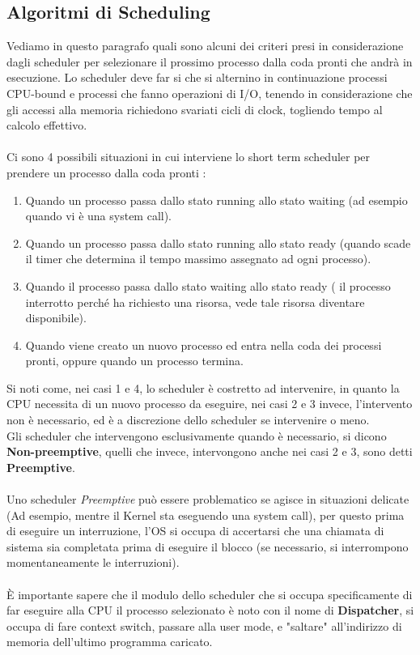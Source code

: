 \documentclass[12pt, letterpaper]{article}
\begin{document}
\subsection{Algoritmi di Scheduling}
Vediamo in questo paragrafo quali sono alcuni dei criteri presi in considerazione dagli scheduler per selezionare 
il prossimo processo dalla coda pronti che andrà in esecuzione. Lo scheduler deve far si che si alternino in continuazione 
processi CPU-bound e processi che fanno operazioni di I/O, tenendo in considerazione che gli accessi alla memoria 
richiedono svariati cicli di clock, togliendo tempo al calcolo effettivo.\\
\hphantom{text}\\Ci sono 4 possibili situazioni in cui interviene lo short term scheduler per prendere un processo 
dalla coda pronti :\begin{enumerate}
    \item  Quando un processo passa dallo stato running allo stato waiting (ad esempio quando vi è una system call).
    \item  Quando un processo passa dallo stato running allo stato ready
     (quando scade il timer che determina il tempo massimo assegnato ad ogni processo).
     \item  Quando il processo passa dallo stato waiting allo stato ready
      ( il processo interrotto perché ha richiesto una risorsa, vede tale risorsa diventare disponibile).
      \item  Quando viene creato un nuovo processo ed entra nella coda dei processi pronti, oppure quando un processo termina.
\end{enumerate}
Si noti come, nei casi 1 e 4, lo scheduler è costretto ad intervenire, in quanto la CPU necessita di un nuovo 
processo da eseguire, nei casi 2 e 3 invece, l'intervento non è necessario, ed è a discrezione dello scheduler 
se intervenire o meno.\\Gli scheduler che intervengono esclusivamente quando è necessario, si dicono 
\textbf{Non-preemptive}, quelli che invece, intervongono anche nei casi 2 e 3, sono detti \textbf{Preemptive}.\\ 
\hphantom{text}\\Uno scheduler \textit{Preemptive} può essere problematico se agisce in situazioni delicate (Ad esempio, 
mentre il Kernel sta eseguendo una system call), per questo prima di eseguire un interruzione, l'OS si occupa di 
accertarsi che una chiamata di sistema sia completata prima di eseguire il blocco (se necessario, si interrompono 
momentaneamente le interruzioni).\\\hphantom{text}\\
È importante sapere che il modulo dello scheduler che si occupa specificamente di far eseguire 
alla CPU il processo selezionato è noto con il nome di \textbf{Dispatcher}, si occupa di fare context switch,
passare alla user mode, e "saltare" all'indirizzo di memoria dell'ultimo programma caricato.
\end{document}
